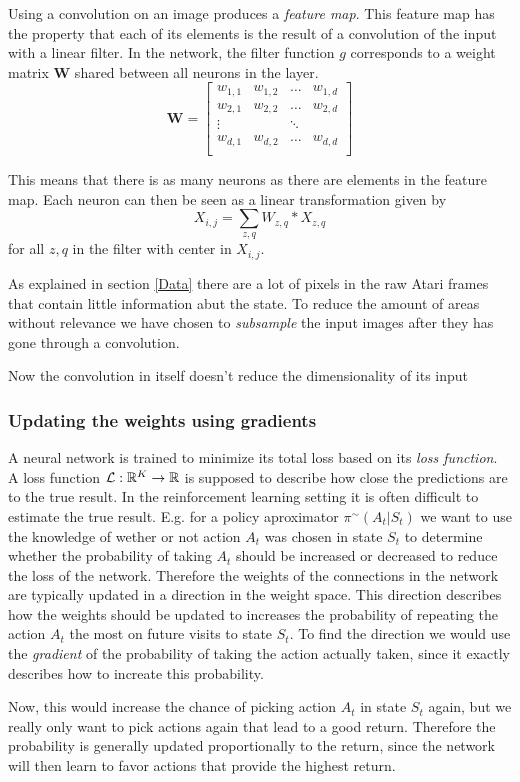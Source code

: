 \documentclass[11pt]{article}
\begin{document}
Using a convolution on an image produces a \textit{feature map}.
This feature map has the property that each of its elements is
the result of a convolution of the input with a linear filter\cite{DeepLearningBook}.
In the network, the filter function $g$ corresponds to a weight matrix $\mathbf{W}$ shared between all neurons in the layer.
$$
\mathbf{W} =
\begin{bmatrix}
    w_{1,1 } & w_{1, 2} & \hdots & w_{1, d} \\
    w_{2,1 } & w_{2, 2} & \hdots & w_{2, d} \\
    \vdots   &          & \ddots &          \\
    w_{d,1 } & w_{d, 2} & \hdots & w_{d, d} \\
\end{bmatrix}
$$

This means that there is as many neurons as there are elements in the feature map.
Each neuron can then be seen as a linear transformation given by
\begin{equation}
    X_{i, j} = \sum\limits_{z, q} W_{z, q} * X_{z, q}
\end{equation}
for all $z, q$ in the filter with center in $X_{i, j}$.

As explained in section \ref{Data} there are a lot of pixels in the raw Atari frames that
contain little information abut the state.
To reduce the amount of areas without relevance we have chosen to \textit{subsample}
the input images after they has gone through a convolution.


Now the convolution in itself doesn't reduce the dimensionality of its input


\subsubsection{Updating the weights using gradients}

A neural network is trained to minimize its total loss based on its \textit{loss
function}.
A loss function $\mathcal{L} : \mathbb{R}^K \to \mathbb{R}$ is supposed to describe how close the
predictions are to the true result.
In the reinforcement learning setting it is often difficult to estimate the
true result.
E.g. for a policy aproximator $\pi^{\sim}(A_t | S_t)$ we want to use the knowledge
of wether or not action $A_t$ was  chosen in state $S_t$ to determine
whether the probability of taking $A_t$ should be increased or decreased to
reduce the loss of the network.
Therefore the weights of the connections in the network are typically updated
in a direction in the weight space.
This direction describes how the weights should be updated to increases the
probability of repeating the action $A_t$ the most on future visits to
state $S_t$\cite{RLbook}.
To find the direction we would use the \textit{gradient} of the probability of
taking the action actually taken, since it exactly describes how to increate
this probability.

Now, this would increase the chance of picking action $A_t$ in state $S_t$ again,
but we really only want to pick actions again that lead to a good return.
Therefore the probability is generally updated proportionally to the
return, since the network will then learn to favor actions that provide
the highest return.
\end{document}
